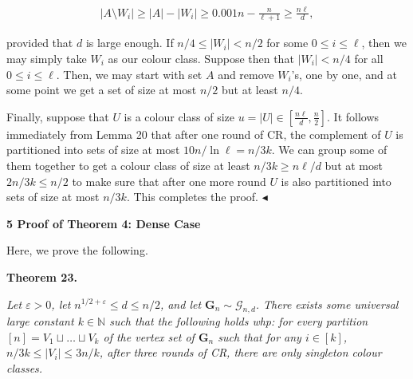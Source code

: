 \[\begin{gathered}
|A\setminus W_{i}|\geq|A|-|W_{i}|\geq 0.001n-\frac{n}{\ell+1}\geq\frac{n\ell}{d},
\end{gathered}\]


provided that $d$ is large enough. If $n/4\leq|W_{i}|<n/2$ for some $0\leq i\leq\ell$, then we may simply take $W_{i}$ as our colour class. Suppose then that $|W_{i}|<n/4$ for all $0\leq i\leq\ell$. Then, we may start with set $A$ and remove $W_{i}$’s, one by one, and at some point we get a set of size at most $n/2$ but at least $n/4$.\par




Finally, suppose that $U$ is a colour class of size $u=|U|\in[\frac{n\ell}{d},\frac{n}{2}]$. It follows immediately from Lemma 20 that after one round of CR, the complement of $U$ is partitioned into sets of size at most $10n/\ln\ell=n/3k$. We can group some of them together to get a colour class of size at least $n/3k\geq n\ell/d$ but at most $2n/3k\leq n/2$ to make sure that after one more round $U$ is also partitioned into sets of size at most $n/3k$. This completes the proof.
$\blacktriangleleft$\par







\par\medskip\noindent\textbf{
5 Proof of Theorem 4: Dense Case}\par




Here, we prove the following.\par





\par\medskip\noindent\textbf{
\textbf{Theorem 23}\textbf{.}
}\par



\emph{Let $\varepsilon>0$, let $n^{1/2+\varepsilon}\leq d\leq n/2$, and let $\mathbf{G}_{n}\sim\mathcal{G}_{n,d}$.
There exists some universal large constant $k\in\mathbb{N}$ such that the following holds whp: for every partition $[n]=V_{1}\sqcup\ldots\sqcup V_{k}$ of the vertex set of $\mathbf{G}_{n}$ such that for any $i\in[k]$, $n/3k\leq|V_{i}|\leq 3n/k$, after three rounds of CR, there are only singleton colour classes.}\par



